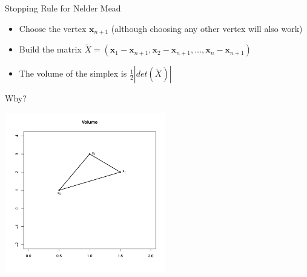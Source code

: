 \documentclass[10pt]{beamer}
\begin{document}
                                                                                              \begin{frame}{Stopping Rule for Nelder Mead}
                                                                                                \begin{itemize}
                                                                                                \item Choose the vertex ${\bm x_{n+1}}$ (although choosing any other vertex will also work)
                                                                                                \item Build the matrix
                                                                                                  $\tilde{X}=\left({\bm x_1}-{\bm x_{n+1}},{\bm x_2-{\bm x_{n+1}}},\ldots, {\bm x_{n}-{\bm x_{n+1}}}\right)$
                                                                                                \item The volume of the simplex is $\frac{1}{2}|det(\tilde{X})|$
                                                                                                \end{itemize}
                                                                                              \end{frame}
                                                                                              \begin{frame}{Why?}
                                                                                                \begin{center}
                                                                                                  \includegraphics[height=7cm]{RCode/geom1.pdf}
                                                                                                \end{center}
                                                                                              \end{frame}
\end{document}
